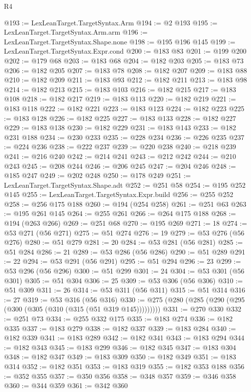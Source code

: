 \begin{lexlean}{R4}
\begin{coremodule}
@193 := LexLeanTarget.TargetSyntax.Arm
@194 := @2 @193
@195 := LexLeanTarget.TargetSyntax.Arm.arm
@196 := LexLeanTarget.TargetSyntax.Shape.none
@198 := @195 @196 @145
@199 := LexLeanTarget.TargetSyntax.Expr.cond
@200 := @183 @83
@201 := @199 @200
@202 := @179 @68
@203 := @183 @68
@204 := @182 @203
@205 := @183 @73
@206 := @182 @205
@207 := @183 @78
@208 := @182 @207
@209 := @183 @88
@210 := @182 @209
@211 := @183 @93
@212 := @182 @211
@213 := @183 @98
@214 := @182 @213
@215 := @183 @103
@216 := @182 @215
@217 := @183 @108
@218 := @182 @217
@219 := @183 @113
@220 := @182 @219
@221 := @183 @118
@222 := @182 @221
@223 := @183 @123
@224 := @182 @223
@225 := @183 @128
@226 := @182 @225
@227 := @183 @133
@228 := @182 @227
@229 := @183 @138
@230 := @182 @229
@231 := @183 @143
@233 := @182 @231 @188
@234 := @230 @233
@235 := @228 @234
@236 := @226 @235
@237 := @224 @236
@238 := @222 @237
@239 := @220 @238
@240 := @218 @239
@241 := @216 @240
@242 := @214 @241
@243 := @212 @242
@244 := @210 @243
@245 := @208 @244
@246 := @206 @245
@247 := @204 @246
@248 := @185 @247
@249 := @202 @248
@250 := @178 @249
@251 := LexLeanTarget.TargetSyntax.Shape.adt
@252 := @251 @58
@254 := @195 @252 @145
@255 := LexLeanTarget.TargetSyntax.Expr.build
@256 := @255 @252
@258 := @256 @175 @188
@260 := @194 (@254 @258)
@261 := @251 @63
@263 := @195 @261 @145
@264 := @255 @261
@266 := @264 @175 @188
@268 := @194 (@263 @266)
@269 := @251 @68
@270 := @195 @269
@271 := 18
@274 := @53 @271 (@56 @271)
@275 := @51 @274
@276 := 19
@279 := @53 @276 (@56 @276)
@280 := @51 @279
@281 := 20
@284 := @53 @281 (@56 @281)
@285 := @51 @284
@286 := 21
@289 := @53 @286 (@56 @286)
@290 := @51 @289
@291 := 22
@294 := @53 @291 (@56 @291)
@295 := @51 @294
@296 := 23
@299 := @53 @296 (@56 @296)
@300 := @51 @299
@301 := 24
@304 := @53 @301 (@56 @301)
@305 := @51 @304
@306 := 25
@309 := @53 @306 (@56 @306)
@310 := @51 @309
@311 := 26
@314 := @53 @311 (@56 @311)
@315 := @51 @314
@316 := 27
@319 := @53 @316 (@56 @316)
@330 := @275 (@280 (@285 (@290 (@295 (@300 (@305 (@310 (@315 (@51 @319 @145)))))))))
@331 := @270 @330
@332 := @251 @73
@334 := @255 @332 @175
@335 := @183 @274
@336 := @182 @335
@337 := @183 @279
@338 := @182 @337
@339 := @183 @284
@340 := @182 @339
@341 := @183 @289
@342 := @182 @341
@343 := @183 @294
@344 := @182 @343
@345 := @183 @299
@346 := @182 @345
@347 := @183 @304
@348 := @182 @347
@349 := @183 @309
@350 := @182 @349
@351 := @183 @314
@352 := @182 @351
@353 := @183 @319
@355 := @182 @353 @188
@356 := @352 @355
@357 := @350 @356
@358 := @348 @357
@359 := @346 @358
@360 := @344 @359
@361 := @342 @360

\end{coremodule}
\end{lexlean}
